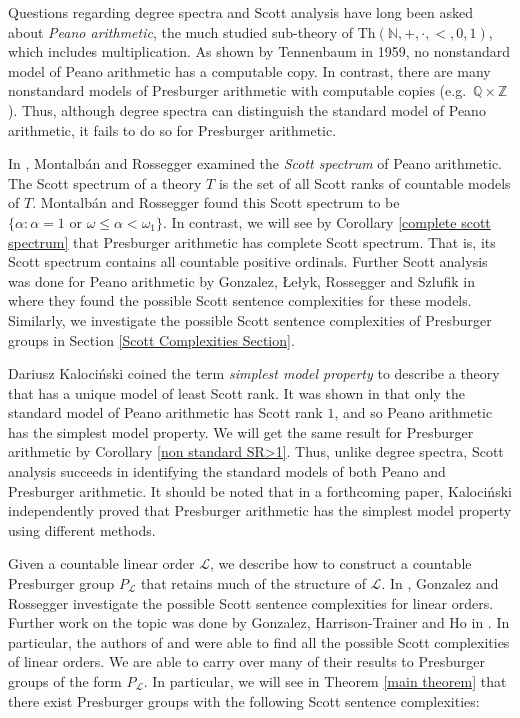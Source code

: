 \documentclass{amsart}%
\numberwithin{theorem}{section}
\newcommand{\Th}{\text{Th}}
\newcommand{\Q}{\mathbb{Q}}
\newcommand{\Z}{\mathbb{Z}}
\newcommand{\N}{\mathbb{N}}
\newcommand{\0}{\emptyset}
\newcommand{\LL}{\mathcal{L}}
\begin{document}
Questions regarding degree spectra and Scott analysis have long been asked about \emph{Peano arithmetic}, the much studied sub-theory of $\Th(\N,+,\cdot,<,0,1)$, which includes multiplication. As shown by Tennenbaum \cite{tennenbaum1959non} in 1959, no nonstandard model of Peano arithmetic has a computable copy.  In contrast, there are many nonstandard models of Presburger arithmetic with computable copies (e.g.\ $\Q\times \Z$). Thus, although degree spectra can distinguish the standard model of Peano arithmetic, it fails to do so for Presburger arithmetic.

In \cite{scott-spec-pa}, Montalb\'an and Rossegger examined the \emph{Scott spectrum} of Peano arithmetic. The Scott spectrum of a theory $T$ is the set of all Scott ranks of countable models of $T$. Montalb\'an and Rossegger found this Scott spectrum to be $\{\alpha: \alpha=1 \text{ or }\omega\leq \alpha< \omega_1\}$. In contrast, we will see by Corollary \ref{complete scott spectrum} that Presburger arithmetic has  complete Scott spectrum. That is, its Scott spectrum contains all countable positive ordinals. Further Scott analysis was done for Peano arithmetic by Gonzalez, \L{}e\l{}yk, Rossegger and Szlufik in \cite{scott-analysis-PA} where they found the possible Scott sentence complexities for these models. Similarly, we investigate the possible Scott sentence complexities of Presburger groups in Section \ref{Scott Complexities Section}. 

Dariusz Kaloci\'nski coined the term \emph{simplest model property} to describe a theory that has a unique model of least Scott rank. It was shown in \cite{scott-spec-pa} that only the standard model of Peano arithmetic has Scott rank $1$, and so Peano arithmetic has the simplest model property. We will get the same result for Presburger arithmetic by Corollary \ref{non standard SR>1}. Thus, unlike degree spectra, Scott analysis succeeds in identifying the standard models of both Peano and Presburger arithmetic. It should be noted that in a forthcoming paper, Kaloci\'nski independently proved that Presburger arithmetic has the simplest model property using different methods.

Given a countable linear order $\LL$, we describe how to construct a countable Presburger group  $P_{\LL}$ that retains much of the structure of $\LL$. In \cite{david-dino}, Gonzalez and Rossegger investigate the possible Scott sentence complexities for linear orders. Further work on the topic was done by Gonzalez, Harrison-Trainer and Ho in \cite{tubo-david-mathew}. In particular, the authors of \cite{tubo-david-mathew} and \cite{david-dino}  were able to find all the possible Scott complexities of linear orders. We are able to carry over many of their results to Presburger groups of the form $P_\LL$. In particular, we will see in Theorem \ref{main theorem} that there exist Presburger groups with the following Scott sentence complexities: 
\end{document}
